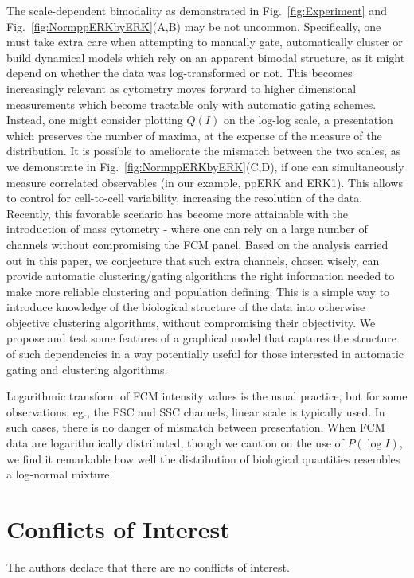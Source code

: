 \documentclass[11pt,a4paper,draft]{article}
\begin{document}
\smallskip
The scale-dependent bimodality as demonstrated in Fig.~\ref{fig:Experiment} and Fig.~\ref{fig:NormppERKbyERK}(A,B) may be not uncommon. Specifically, one must take extra care when attempting to manually gate, automatically cluster or build dynamical models which rely on an apparent bimodal structure, as it might depend on whether the data was log-transformed or not. This becomes increasingly relevant as cytometry moves forward to higher dimensional measurements which become tractable only with automatic gating schemes. Instead, one might consider plotting $Q(I)$ on the log-log scale, a presentation which preserves the number of maxima, at the expense of the measure of the distribution. It is possible to ameliorate the mismatch between the two scales, as we demonstrate in Fig.~\ref{fig:NormppERKbyERK}(C,D), if one can simultaneously measure correlated observables (in our example, ppERK and ERK1). This allows to control for cell-to-cell variability, increasing the resolution of the data. Recently, this favorable scenario has become more attainable with the introduction of mass cytometry - where one can rely on a large number of channels without compromising the FCM panel. Based on the analysis carried out in this paper, we conjecture that such extra channels, chosen wisely, can provide automatic clustering/gating algorithms the right information needed to make more reliable clustering and population defining. This is a simple way to introduce knowledge of the biological structure of the data into otherwise objective clustering algorithms, without compromising their objectivity. We propose and test some features of a graphical model that captures the structure of such dependencies in a way potentially useful for those interested in automatic gating and clustering algorithms. 

\smallskip 
Logarithmic transform of FCM intensity values is the usual practice, but for some observations, eg., the FSC and SSC channels, linear scale is typically used. In such cases, there is no danger of mismatch between presentation. When FCM data are logarithmically distributed, though we caution on the use of $P(\log I)$, we find it remarkable how well the distribution of biological quantities resembles a log-normal mixture. 

\section*{Conflicts of Interest}
The authors declare that there are no conflicts of interest.
\end{document}
